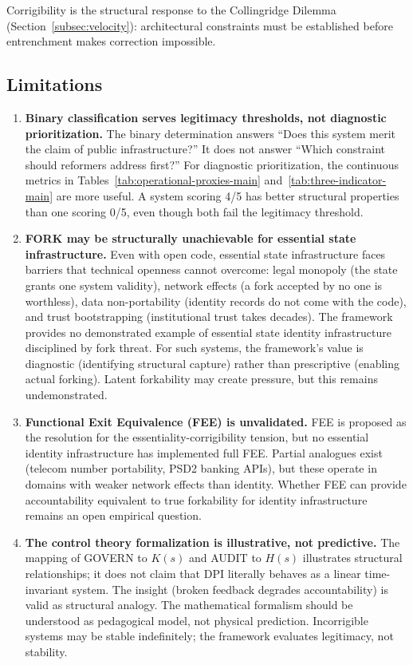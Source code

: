 \documentclass{article}
\begin{document}
Corrigibility is the structural response to the Collingridge Dilemma (Section~\ref{subsec:velocity}): architectural constraints must be established before entrenchment makes correction impossible.

\subsection{Limitations}

\begin{enumerate}
    \item \textbf{Binary classification serves legitimacy thresholds, not diagnostic prioritization.} The binary determination answers ``Does this system merit the claim of public infrastructure?'' It does not answer ``Which constraint should reformers address first?'' For diagnostic prioritization, the continuous metrics in Tables~\ref{tab:operational-proxies-main} and~\ref{tab:three-indicator-main} are more useful. A system scoring 4/5 has better structural properties than one scoring 0/5, even though both fail the legitimacy threshold.

    \item \textbf{FORK may be structurally unachievable for essential state infrastructure.} Even with open code, essential state infrastructure faces barriers that technical openness cannot overcome: legal monopoly (the state grants one system validity), network effects (a fork accepted by no one is worthless), data non-portability (identity records do not come with the code), and trust bootstrapping (institutional trust takes decades). The framework provides no demonstrated example of essential state identity infrastructure disciplined by fork threat. For such systems, the framework's value is diagnostic (identifying structural capture) rather than prescriptive (enabling actual forking). Latent forkability may create pressure, but this remains undemonstrated.

    \item \textbf{Functional Exit Equivalence (FEE) is unvalidated.} FEE is proposed as the resolution for the essentiality-corrigibility tension, but no essential identity infrastructure has implemented full FEE. Partial analogues exist (telecom number portability, PSD2 banking APIs), but these operate in domains with weaker network effects than identity. Whether FEE can provide accountability equivalent to true forkability for identity infrastructure remains an open empirical question.

    \item \textbf{The control theory formalization is illustrative, not predictive.} The mapping of GOVERN to $K(s)$ and AUDIT to $H(s)$ illustrates structural relationships; it does not claim that DPI literally behaves as a linear time-invariant system. The insight (broken feedback degrades accountability) is valid as structural analogy. The mathematical formalism should be understood as pedagogical model, not physical prediction. Incorrigible systems may be stable indefinitely; the framework evaluates legitimacy, not stability.


\end{enumerate}
\end{document}
